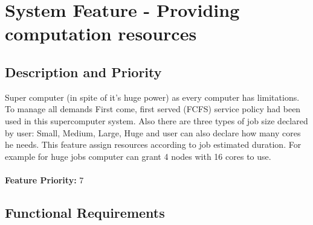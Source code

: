 \documentclass{scrreprt}
\begin{document}
\section{System Feature - Providing computation resources  }

\subsection{Description and Priority}
Super computer (in spite of it's huge power) as every computer has limitations.
To manage all demands First come, first served  (FCFS) service policy had been used in this supercomputer system. Also there are three types of job size declared by user: Small, Medium, Large, Huge and user can also declare how many cores he needs. This feature assign resources according to job estimated duration. For example for huge jobs computer can grant 4 nodes with 16 cores to use.
\\
\\
\textbf{Feature Priority: } 7

\subsection{Functional Requirements}
\end{document}
